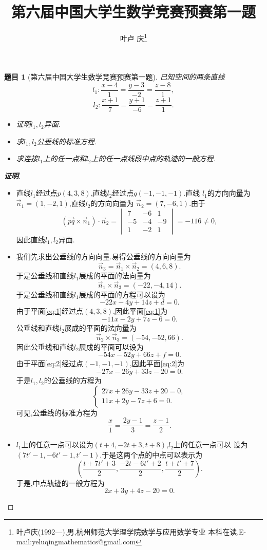 \documentclass[a4paper]{article}
\newtheorem*{exe}{题目}
\newenvironment{exercise}
{\bigskip\begin{mdframed}\begin{exe}}
    {\end{exe}\end{mdframed}\bigskip}
\newcommand{\ov}{\overrightarrow} \newcommand{\sik}{\sum_{i=1}^k}
\begin{document}
\title{\huge{\bf{第六届中国大学生数学竞赛预赛第一题}}} \author{\small{叶卢
    庆\footnote{叶卢庆(1992---),男,杭州师范大学理学院数学与应用数学专业
      本科在读,E-mail:yeluqingmathematics@gmail.com}}}
\maketitle
\begin{exercise}[第六届中国大学生数学竞赛预赛第一题]
  已知空间的两条直线
$$
l_1:\frac{x-4}{1}=\frac{y-3}{-2}=\frac{z-8}{1},
$$
$$
l_2:\frac{x+1}{7}=\frac{y+1}{-6}=\frac{z+1}{1}.
$$
\begin{itemize}
\item 证明$l_1,l_2$异面.
\item 求$l_1,l_2$公垂线的标准方程.
\item 求连接$l_1$上的任一点和$l_2$上的任一点线段中点的轨迹的一般方程.
\end{itemize}
\end{exercise}
\begin{proof}[\textbf{证明}]
  \begin{itemize}
  \item 直线$l_1$经过点$p(4,3,8)$,直线$l_2$经过点$q(-1,-1,-1)$.直线
    $l_1$的方向向量为$\ov{n}_1=(1,-2,1)$,直线$l_2$的方向向量为
    $\ov{n}_2=(7,-6,1)$.由于
$$
(\ov{pq}\times \ov{n}_1)\cdot \ov{n}_2=
\begin{vmatrix}
  7&-6&1\\
-5&-4&-9\\
1&-2&1
\end{vmatrix}=-116\neq 0,
$$
因此直线$l_1,l_2$异面.
\item 我们先求出公垂线的方向向量.易得公垂线的方向向量为
$$
\ov{n}_{3}=\ov{n}_1\times \ov{n}_2=(4,6,8).
$$
于是公垂线和直线$l_1$展成的平面的法向量为
$$
\ov{n}_1\times \ov{n}_3=(-22,-4,14).
$$
于是公垂线和直线$l_1$展成的平面的方程可以设为
\begin{equation}\label{eq:1}
-22x-4y+14z+d=0.
\end{equation}
由于平面\eqref{eq:1}经过点$(4,3,8)$,因此平面\eqref{eq:1}为
$$
-11x-2y+7z-6=0.
$$
公垂线和直线$l_2$展成的平面的法向量为
$$
\ov{n}_2\times\ov{n}_3=(-54,-52,66).
$$
因此公垂线和直线$l_2$展成的平面可以设为
\begin{equation}
  \label{eq:2}
  -54x-52y+66z+f=0.
\end{equation}
由于平面\eqref{eq:2}经过点$(-1,-1,-1)$,因此平面\eqref{eq:2}为
$$
-27x-26y+33z-20=0.
$$
于是$l_1,l_2$的公垂线的方程为
$$
\begin{cases}
  27x+26y-33z+20=0,\\
11x+2y-7z+6=0.
\end{cases}
$$
可见,公垂线的标准方程为
$$
\frac{x}{1}=\frac{2y-1}{3}=\frac{z-1}{2}.
$$
\item $l_1$上的任意一点可以设为$(t+4,-2t+3,t+8)$,$l_2$上的任意一点可以
  设为$(7t'-1,-6t'-1,t'-1)$.于是这两个点的中点可以表示为
$$
(\frac{t+7t'+3}{2},\frac{-2t-6t'+2}{2},\frac{t+t'+7}{2}).
$$
于是,中点轨迹的一般方程为
$$
2x+3y+4z-20=0.
$$
  \end{itemize}
\end{proof}
\end{document}
